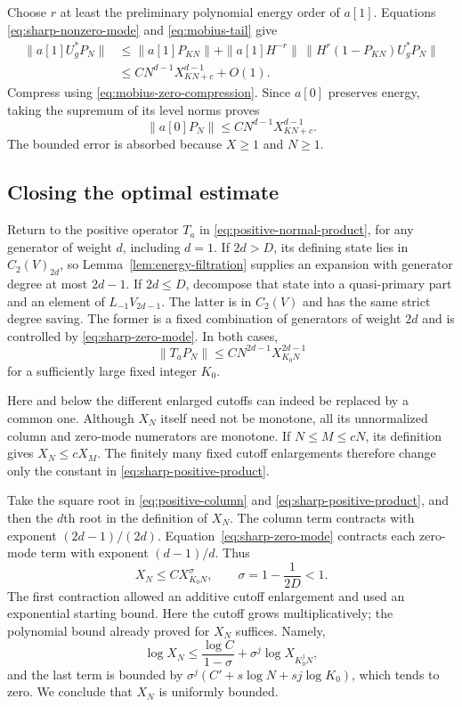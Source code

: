 Choose $r$ at least the preliminary polynomial energy order of $a[1]$.
Equations \eqref{eq:sharp-nonzero-mode} and \eqref{eq:mobius-tail}
give
\begin{align*}
 \|a[1]U_g^*P_N\|
 &\leq \|a[1]P_{KN}\|
      +\|a[1]H^{-r}\|\,
          \|H^r(1-P_{KN})U_g^*P_N\|\\
 &\leq C N^{d-1}X_{KN+c}^{d-1}+O(1).
\end{align*}
Compress using \eqref{eq:mobius-zero-compression}.  Since $a[0]$
preserves energy, taking the supremum of its level norms proves
\begin{equation}\label{eq:sharp-zero-mode}
 \|a[0]P_N\|
 \leq C N^{d-1}X_{KN+c}^{d-1}.
\end{equation}
The bounded error is absorbed because $X\geq1$ and $N\geq1$.

\subsection{Closing the optimal estimate}

Return to the positive operator $T_a$ in
\eqref{eq:positive-normal-product}, for any generator of weight $d$,
including $d=1$.  If $2d>D$, its defining state lies in
$C_2(V)_{2d}$, so Lemma~\ref{lem:energy-filtration} supplies an
expansion with generator degree at most $2d-1$.  If $2d\leq D$,
decompose that state into a quasi-primary part and an element of
$L_{-1}V_{2d-1}$.  The latter is in $C_2(V)$ and has the same strict
degree saving.  The former is a fixed combination of generators of
weight $2d$ and is controlled by \eqref{eq:sharp-zero-mode}.  In both
cases,
\begin{equation}\label{eq:sharp-positive-product}
 \|T_aP_N\|
 \leq C N^{2d-1}X_{K_0N}^{2d-1}
\end{equation}
for a sufficiently large fixed integer $K_0$.

Here and below the different enlarged cutoffs can indeed be replaced
by a common one.  Although $X_N$ itself need not be monotone, all its
unnormalized column and zero-mode numerators are monotone.  If
$N\leq M\leq cN$, its definition gives $X_N\leq cX_M$.
The finitely many fixed cutoff enlargements therefore change only the
constant in \eqref{eq:sharp-positive-product}.

Take the square root in \eqref{eq:positive-column} and
\eqref{eq:sharp-positive-product}, and then the $d$th root in the
definition of $X_N$.  The column term contracts with exponent
$(2d-1)/(2d)$.  Equation~\eqref{eq:sharp-zero-mode} contracts each
zero-mode term with exponent $(d-1)/d$.  Thus
\begin{equation}\label{eq:second-energy-contraction}
 X_N\leq C X_{K_0N}^{\sigma},\qquad
 \sigma=1-\frac1{2D}<1.
\end{equation}
The first contraction allowed an additive cutoff enlargement and used
an exponential starting bound. Here the cutoff grows multiplicatively;
the polynomial bound already proved for $X_N$ suffices. Namely,
\[
 \log X_N\leq\frac{\log C}{1-\sigma}
        +\sigma^j\log X_{K_0^jN},
\]
and the last term is bounded by
$\sigma^j(C'+s\log N+sj\log K_0)$, which tends to zero.  We conclude
that $X_N$ is uniformly bounded.

